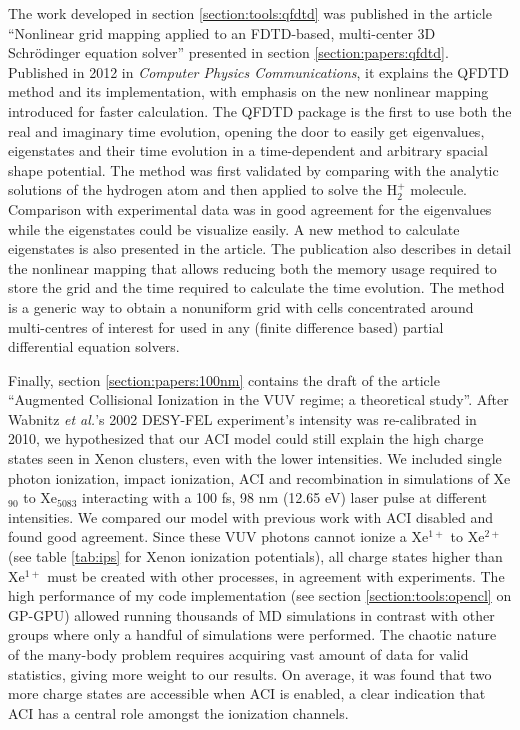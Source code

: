 The work developed in section \ref{section:tools:qfdtd} was published in the article
``Nonlinear grid mapping applied to an FDTD-based, multi-center 3D
Schr\"odinger equation solver'' presented in section \ref{section:papers:qfdtd}.
Published in 2012 in \textit{Computer Physics Communications}\cite{Bigaouette2011}, it
explains the QFDTD method and its implementation, with emphasis on the new
nonlinear mapping introduced for faster calculation. The QFDTD package is the
first to use both the real and imaginary time evolution, opening the door to
easily get eigenvalues, eigenstates and their time evolution in a time-dependent
and arbitrary spacial shape potential.
The method was first validated by comparing with the analytic solutions of
the hydrogen atom and then applied to solve the H$_{2}^{+}$ molecule.
Comparison with experimental data was in good agreement for the eigenvalues
while the eigenstates could be visualize easily. A new method to calculate
eigenstates is also presented in the article. The publication also
describes in detail the nonlinear mapping that allows reducing both the memory
usage required to store the grid and the time required to calculate the time
evolution. The method is a generic way to obtain a nonuniform grid with cells
concentrated around multi-centres of interest for used in any (finite difference
based) partial differential equation solvers.




Finally, section \ref{section:papers:100nm} contains the draft of the article
``Augmented Collisional Ionization in the VUV regime; a theoretical study''.
After Wabnitz \textit{et al.}'s
2002 DESY-FEL experiment's intensity was re-calibrated in 2010, we hypothesized
that our ACI model could still explain the high charge states seen in Xenon
clusters, even with the lower intensities. We included single photon ionization,
impact ionization, ACI and recombination in simulations of Xe$_{90}$ to Xe$_{5083}$
interacting with a 100 fs, 98 nm (12.65 eV) laser pulse at different intensities.
We compared our model
with previous work with ACI disabled and found good agreement. Since these VUV
photons cannot ionize a Xe$^{1+}$ to Xe$^{2+}$ (see table \ref{tab:ips} for Xenon
ionization potentials), all charge states higher than Xe$^{1+}$ must be created
with other processes, in agreement with experiments. The high performance of my
code implementation (see section \ref{section:tools:opencl} on GP-GPU) allowed
running thousands of MD simulations in contrast with other groups where only
a handful of simulations were performed. The chaotic nature of the many-body
problem requires acquiring vast amount of data for valid statistics, giving more
weight to our results. On average, it was found that two more charge states are
accessible when ACI is enabled, a clear indication that ACI has a central role
amongst the ionization channels.

